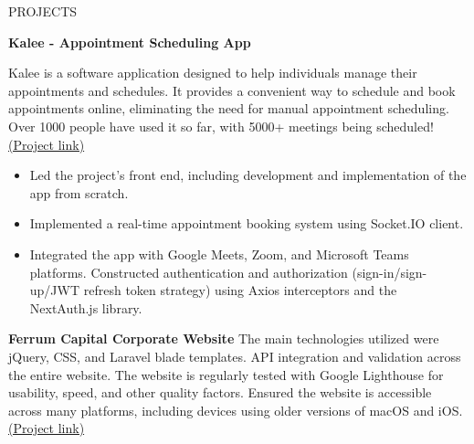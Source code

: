 \documentclass{resume} %
\begin{document}
\begin{rSection}{PROJECTS}
\vspace{-1.25em}
\item \textbf{
Kalee - Appointment Scheduling App} {Kalee is a software application designed to help individuals manage their appointments and schedules. It provides a convenient way to schedule and book appointments online, eliminating the need for manual appointment scheduling. Over 1000 people have used it so far, with 5000+ meetings being scheduled! \href{https://www.producthunt.com/products/kalee}{(Project link)} \begin{itemize}
    \itemsep -3pt {} \item Led the project's front end, including development and implementation of the app from scratch.
    \item Implemented a real-time appointment booking system using Socket.IO client.
   \item Integrated the app with Google Meets, Zoom, and Microsoft Teams platforms. Constructed authentication and authorization (sign-in/sign-up/JWT refresh token strategy) using Axios interceptors and the NextAuth.js library. \end{itemize}}
\item \textbf{
    Ferrum Capital Corporate Website} {The main technologies utilized were jQuery, CSS, and Laravel blade templates. API integration and validation across the entire website. The website is regularly tested with Google Lighthouse for usability, speed, and other quality factors. Ensured the website is accessible across many platforms, including devices using older versions of macOS and iOS. \href{https://ferrumcapital.az}{(Project link)}}
\end{rSection} 

\end{document}
